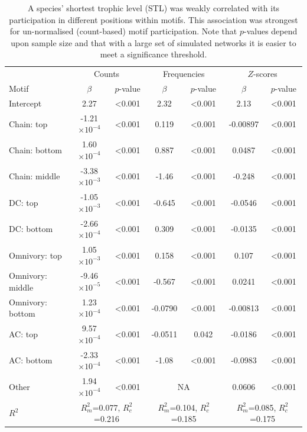 \documentclass[12pt]{article}
\begin{document}
\begin{spacing}{2.0}
			\begin{table}[hb!]
    			\caption{A species' shortest trophic level (STL) was weakly correlated with its participation in different positions within motifs. This association was strongest for un-normalised (count-based) motif participation. Note that $p$-values depend upon sample size and that with a large set of simulated networks it is easier to meet a significance threshold.}
    			\label{tab:positions_vs_STL}
    			\begin{tabular}{l | c c | c c | c c}
    			& \multicolumn{2}{c|}{Counts} & \multicolumn{2}{c|}{Frequencies} & \multicolumn{2}{c}{$Z$-scores} \\
    			Motif & $\beta$ & $p$-value & $\beta$ & $p$-value & $\beta$ & $p$-value \\
    			\hline
                Intercept	&	2.27	&	\textless0.001	&	2.32	&	\textless0.001	&	2.13	&	\textless0.001	\\
                Chain: top	&	-1.21$\times10^{-4}$	&	\textless0.001	&	0.119	&	\textless0.001	&	-0.00897	&	\textless0.001	\\
                Chain: bottom	&	1.60$\times10^{-4}$	&	\textless0.001	&	0.887	&	\textless0.001	&	0.0487	&	\textless0.001	\\
                Chain: middle	&	-3.38$\times10^{-3}$	&	\textless0.001	&	-1.46	&	\textless0.001	&	-0.248	&	\textless0.001	\\
                DC: top	&	-1.05$\times10^{-3}$	&	\textless0.001	&	-0.645	&	\textless0.001	&	-0.0546	&	\textless0.001	\\
                DC: bottom	&	-2.66$\times10^{-4}$	&	\textless0.001	&	0.309	&	\textless0.001	&	-0.0135	&	\textless0.001	\\
                Omnivory: top	&	1.05$\times10^{-3}$	&	\textless0.001	&	0.158	&	\textless0.001	&	0.107	&	\textless0.001	\\
                Omnivory: middle	&	-9.46$\times10^{-5}$ &	\textless0.001	&	-0.567	&	\textless0.001	&	0.0241	&	\textless0.001	\\
                Omnivory: bottom	&	1.23$\times10^{-4}$	&	\textless0.001	&	-0.0790	&	\textless0.001	&	-0.00813	&	\textless0.001	\\
                AC: top	&	9.57$\times10^{-4}$	&	\textless0.001	&	-0.0511	&	0.042	&	-0.0186	&	\textless0.001	\\
                AC: bottom	&	-2.33$\times10^{-4}$	&	\textless0.001	&	-1.08	&	\textless0.001	&	-0.0983	&	\textless0.001	\\
                Other	&	1.94$\times10^{-4}$	&	\textless0.001	&	\multicolumn{2}{c|}{NA}			&	0.0606	&	\textless0.001	\\
    			\hline
    			$R^2$ & \multicolumn{2}{c|}{\tiny{$R^2_m$=0.077, $R^2_c$=0.216}} & 
    			\multicolumn{2}{c|}{\tiny{$R^2_m$=0.104, $R^2_c$=0.185}} & 
    			\multicolumn{2}{c}{\tiny{$R^2_m$=0.085, $R^2_c$=0.175}} \\
    			\end{tabular}
    			\end{table}


\end{spacing}
\end{document}
